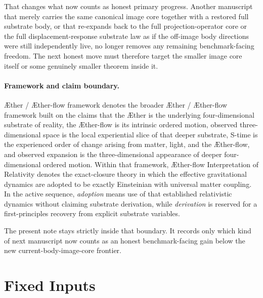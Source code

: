 \documentclass[11pt]{article}
\newcommand{\Aether}{\AE{}ther}
\newcommand{\Aflow}{\AE{}ther-flow}
\newcommand{\TheoryName}{\Aflow{} Interpretation of Relativity}
\newcommand{\TheoryProgram}{\Aether{} / \Aflow{} framework}
\begin{document}
That changes what now counts as honest primary progress. Another manuscript that merely carries the same canonical image core together with a restored full substrate body, or that re-expands back to the full projection-operator core or the full displacement-response substrate law as if the off-image body directions were still independently live, no longer removes any remaining benchmark-facing freedom. The next honest move must therefore target the smaller image core itself or some genuinely smaller theorem inside it.

\paragraph{Framework and claim boundary.}
\TheoryProgram{} denotes the broader \Aether{} / \Aflow{} framework built on the claims that the \Aether{} is the underlying four-dimensional substrate of reality, the \Aflow{} is its intrinsic ordered motion, observed three-dimensional space is the local experiential slice of that deeper substrate, S-time is the experienced order of change arising from matter, light, and the \Aflow{}, and observed expansion is the three-dimensional appearance of deeper four-dimensional ordered motion. Within that framework, \TheoryName{} denotes the exact-closure theory in which the effective gravitational dynamics are adopted to be exactly Einsteinian with universal matter coupling. In the active sequence, \emph{adoption} means use of that established relativistic dynamics without claiming substrate derivation, while \emph{derivation} is reserved for a first-principles recovery from explicit substrate variables.

The present note stays strictly inside that boundary. It records only which kind of next manuscript now counts as an honest benchmark-facing gain below the new current-body-image-core frontier.

\section{Fixed Inputs}
\end{document}

